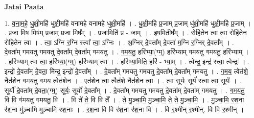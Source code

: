 \documentclass[17pt]{extarticle}
\begin{document}
\textbf{Jatai Paata} \newline

1. व॒ना॒म॒हे॒ धु॒क्षी॒महि॑ धुक्षी॒महि॑ वनामहे वनामहे धुक्षी॒महि॑ । . धु॒क्षी॒महि॑ प्र॒जाम् प्र॒जाम् धु॑क्षी॒महि॑ धुक्षी॒महि॑ प्र॒जाम् । . प्र॒जा मिष॒ मिष॑म् प्र॒जाम् प्र॒जा मिष᳚म् । . प्र॒जामिति॑ प्र - जाम् । . इष॒मितीष᳚म् । . रोहि॑तेन त्वा त्वा॒ रोहि॑तेन॒ रोहि॑तेन त्वा । . त्वा॒ ऽग्नि र॒ग्नि स्त्वा᳚ त्वा॒ ऽग्निः । . अ॒ग्निर् दे॒वता᳚म् दे॒वता॑ म॒ग्नि र॒ग्निर् दे॒वता᳚म् । . दे॒वता᳚म् गमयतु गमयतु दे॒वता᳚म् दे॒वता᳚म् गमयतु । . ग॒म॒य॒तु॒ हरि॑भ्या॒(ग्म्॒) हरि॑भ्याम् गमयतु गमयतु॒ हरि॑भ्याम् । . हरि॑भ्याम् त्वा त्वा॒ हरि॑भ्या॒(ग्म्॒) हरि॑भ्याम् त्वा । . हरि॑भ्या॒मिति॒ हरि॑ - भ्या॒म् । . त्वेन्द्र॒ इन्द्र॑ स्त्वा॒ त्वेन्द्रः॑ । . इन्द्रो॑ दे॒वता᳚म् दे॒वता॒ मिन्द्र॒ इन्द्रो॑ दे॒वता᳚म् । . दे॒वता᳚म् गमयतु गमयतु दे॒वता᳚म् दे॒वता᳚म् गमयतु । . ग॒म॒य॒ त्वेत॑शे॒ नैत॑शेन गमयतु गमय॒ त्वेत॑शेन । . एत॑शेन त्वा॒ त्वैत॑शे॒ नैत॑शेन त्वा । . त्वा॒ सूर्यः॒ सूर्य॑ स्त्वा त्वा॒ सूर्यः॑ । . सूर्यो॑ दे॒वता᳚म् दे॒वता॒(ग्म्॒) सूर्यः॒ सूर्यो॑ दे॒वता᳚म् । . दे॒वता᳚म् गमयतु गमयतु दे॒वता᳚म् दे॒वता᳚म् गमयतु । . ग॒म॒य॒तु॒ वि वि ग॑मयतु गमयतु॒ वि । . वि ते॑ ते॒ वि वि ते᳚ । . ते॒ मु॒ञ्चा॒मि॒ मु॒ञ्चा॒मि॒ ते॒ ते॒ मु॒ञ्चा॒मि॒ । . मु॒ञ्चा॒मि॒ र॒श॒ना र॑श॒ना मु॑ञ्चामि मुञ्चामि रश॒नाः । . र॒श॒ना वि वि र॑श॒ना र॑श॒ना वि । . वि र॒श्मीन् र॒श्मीन्. वि वि र॒श्मीन् । \newline
\end{document}
